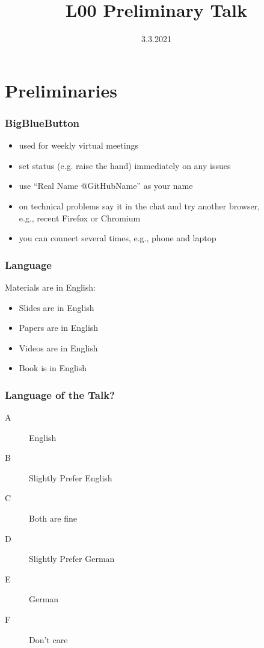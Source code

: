


\title{L00 Preliminary Talk}
\date{3.3.2021}


\section{Preliminaries}

\begin{frame}
	\frametitle{BigBlueButton}
	\begin{itemize}
		\item used for weekly virtual meetings
		\item set status (e.g. raise the hand) immediately on any issues
		\item use ``Real Name @GitHubName'' as your name
		\item on technical problems say it in the chat
		and try another browser, \\ e.g., recent Firefox or Chromium
		\item you can connect several times, e.g., phone and laptop
	\end{itemize}
\end{frame}

\begin{frame}
	\frametitle{Language}
	Materials are in English:
	\begin{itemize}
		\item Slides are in English
		\item Papers are in English
		\item Videos are in English
		\item Book is in English
	\end{itemize}
\end{frame}

\begin{assignment}
	\frametitle{Language of the Talk?}
	\begin{task}
	\begin{description}
	\item[A] English
	\item[B] Slightly Prefer English
	\item[C] Both are fine
	\item[D] Slightly Prefer German
	\item[E] German
	\item[F] Don't care
	\end{description}
	\end{task}
\end{assignment}

